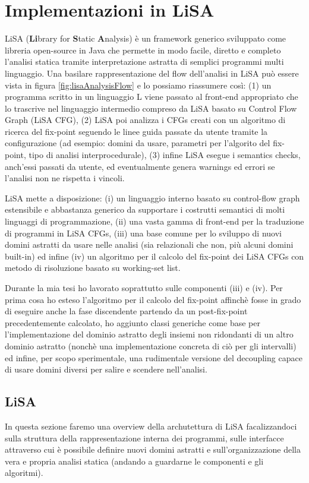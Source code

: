\chapter{Implementazioni in LiSA}\label{chapter:lisa}



LiSA (\textbf{Li}brary for \textbf{S}tatic \textbf{A}nalysis) è un framework generico sviluppato come libreria open-source in Java che permette in modo facile, diretto e completo l'analisi statica tramite interpretazione astratta di semplici programmi multi linguaggio. Una basilare rappresentazione del flow dell'analisi in LiSA può essere vista in figura \ref{fig:lisaAnalysisFlow} e lo possiamo riassumere così: (1) un programma scritto in un linguaggio L viene passato al front-end appropriato che lo trascrive nel linguaggio intermedio compreso da LiSA basato su Control Flow Graph (LiSA CFG), (2) LiSA poi analizza i CFGs creati con un algoritmo di ricerca del fix-point seguendo le linee guida passate da utente tramite la configurazione (ad esempio: domini da usare, parametri per l'algorito del fix-point, tipo di analisi interprocedurale), (3) infine LiSA esegue i semantics checks, anch'essi passati da utente, ed eventualmente genera warnings ed errori se l'analisi non ne rispetta i vincoli. 

LiSA mette a disposizione: (i) un linguaggio interno basato su control-flow graph estensibile e abbastanza generico da supportare i costrutti semantici di molti linguaggi di programmazione, (ii) una vasta gamma di front-end per la traduzione di programmi in LiSA CFGs, (iii) una base comune per lo sviluppo di nuovi domini astratti da usare nelle analisi (sia relazionali che non, più alcuni domini built-in) ed infine (iv) un algoritmo per il calcolo del fix-point dei LiSA CFGs con metodo di risoluzione basato su working-set list.

Durante la mia tesi ho lavorato soprattutto sulle componenti (iii) e (iv). Per prima cosa ho esteso l'algoritmo per il calcolo del fix-point affinchè fosse in grado di eseguire anche la fase discendente partendo da un post-fix-point precedentemente calcolato, ho aggiunto classi generiche come base per l'implementazione del dominio astratto degli insiemi non ridondanti di un altro dominio astratto (nonchè una implementazione concreta di ciò per gli intervalli) ed infine, per scopo sperimentale, una rudimentale versione del decoupling capace di usare domini diversi per salire e scendere nell'analisi.

\section{LiSA}
In questa sezione faremo una overview della archutettura di LiSA facalizzandoci sulla struttura della rappresentazione interna dei programmi, sulle interfacce attraverso cui è possibile definire nuovi domini astratti e sull'organizzazione della vera e propria analisi statica (andando a guardarne le componenti e gli algoritmi).

